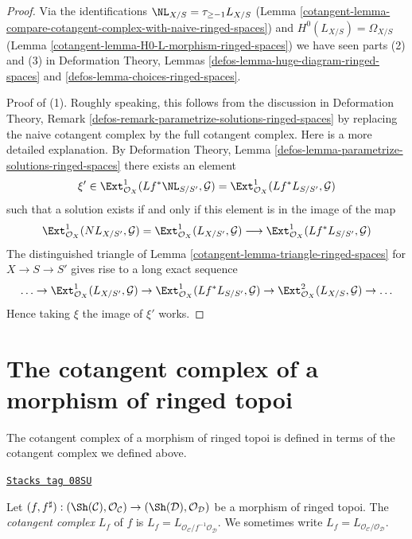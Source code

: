 \begin{proof}

Via the identifications $\NL_{X/S} = \tau_{\geq -1}L_{X/S}$
(Lemma \ref{cotangent-lemma-compare-cotangent-complex-with-naive-ringed-spaces})
and
$H^0(L_{X/S}) = \Omega_{X/S}$
(Lemma \ref{cotangent-lemma-H0-L-morphism-ringed-spaces})
we have seen parts (2) and (3) in
Deformation Theory, Lemmas \ref{defos-lemma-huge-diagram-ringed-spaces} and
\ref{defos-lemma-choices-ringed-spaces}.

\medskip\noindent
Proof of (1). Roughly speaking, this follows from the discussion in
Deformation Theory, Remark
\ref{defos-remark-parametrize-solutions-ringed-spaces}
by replacing the naive cotangent complex by the full cotangent complex.
Here is a more detailed explanation. By
Deformation Theory, Lemma \ref{defos-lemma-parametrize-solutions-ringed-spaces}
there exists an element
$$
\xi' \in
\Ext^1_{\mathcal{O}_X}(Lf^*\NL_{S/S'}, \mathcal{G}) =
\Ext^1_{\mathcal{O}_X}(Lf^*L_{S/S'}, \mathcal{G})
$$
such that a solution exists if and only if this element is in
the image of the map
$$
\Ext^1_{\mathcal{O}_X}(NL_{X/S'}, \mathcal{G}) =
\Ext^1_{\mathcal{O}_X}(L_{X/S'}, \mathcal{G})
\longrightarrow
\Ext^1_{\mathcal{O}_X}(Lf^*L_{S/S'}, \mathcal{G})
$$
The distinguished triangle of Lemma \ref{cotangent-lemma-triangle-ringed-spaces}
for $X \to S \to S'$ gives rise to a long exact sequence
$$
\ldots \to
\Ext^1_{\mathcal{O}_X}(L_{X/S'}, \mathcal{G}) \to
\Ext^1_{\mathcal{O}_X}(Lf^*L_{S/S'}, \mathcal{G}) \to
\Ext^2_{\mathcal{O}_X}(L_{X/S}, \mathcal{G}) \to \ldots
$$
Hence taking $\xi$ the image of $\xi'$ works.
\end{proof}

\section{The cotangent complex of a morphism of ringed topoi}
\label{cotangent-section-cotangent-morphism-ringed-topoi}
The cotangent complex of a morphism of ringed topoi is defined
in terms of the cotangent complex we defined above.

\begin{definition}
\label{cotangent-definition-cotangent-complex-morphism-ringed-topoi}
\href{https://stacks.math.columbia.edu/tag/08SU}{\texttt{Stacks tag 08SU}}

Let $(f, f^\sharp) : (\Sh(\mathcal{C}), \mathcal{O}_\mathcal{C}) \to
(\Sh(\mathcal{D}), \mathcal{O}_\mathcal{D})$ be a morphism of ringed topoi.
The {\it cotangent complex} $L_f$ of $f$ is
$L_f = L_{\mathcal{O}_\mathcal{C}/f^{-1}\mathcal{O}_\mathcal{D}}$.
We sometimes write $L_f = L_{\mathcal{O}_\mathcal{C}/\mathcal{O}_\mathcal{D}}$.
\end{definition}

